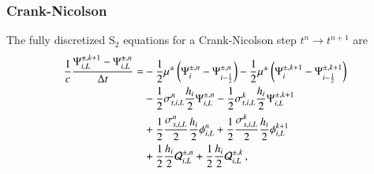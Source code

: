 \documentclass[preprint,12pt]{elsarticle}
\begin{document}
\subsubsection{Crank-Nicolson}
The fully discretized S$_2$ equations for a Crank-Nicolson step
$t^n\rightarrow t^{n+1}$ are
\begin{equation}\lequ{S2CNfullL}\begin{split}
  \frac{1}{c}\frac{\Psi\iL^{\pm,k+1}-\Psi\iL^{\pm,n}}{\dt} = &
  -\half\mu^\pm\fn{\Psi^{\pm,n}_i - \Psi^{\pm,n}_{i-\half}}
  -\half\mu^\pm\fn{\Psi^{\pm,k+1}_i - \Psi^{\pm,k+1}_{i-\half}}\\
  &-\half\sigma_{t,i,L}^n\frac{h_i}{2}\Psi\iL^{\pm,n}
   -\half\sigma_{t,i,L}^k\frac{h_i}{2}\Psi\iL^{\pm,k+1}\\
  &+\half\frac{\sigma_{s,i,L}^n}{2}\frac{h_i}{2}\phi\iL^n
   +\half\frac{\sigma_{s,i,L}^k}{2}\frac{h_i}{2}\phi\iL^{k+1}\\
  &+\half\frac{h_i}{2}\Q_{i,L}^{\pm,n}
   +\half\frac{h_i}{2}\Q_{i,L}^{\pm,k} \pec
\end{split}\end{equation}
\end{document}
